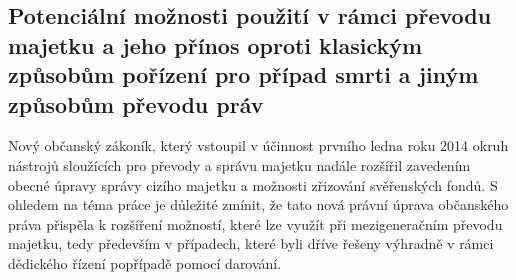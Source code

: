\documentclass{article}
\begin{document}

\newpage

\subsection{Potenciální možnosti použití v rámci převodu majetku a jeho přínos oproti klasickým způsobům pořízení pro případ smrti a jiným způsobům převodu práv}




Nový občanský zákoník, který vstoupil v účinnost prvního ledna roku 2014 okruh nástrojů sloužících pro převody a správu majetku nadále rozšířil zavedením obecné úpravy správy cizího majetku a možnosti zřizování svěřenských fondů. S ohledem na téma práce je důležité zmínit, že tato nová právní úprava občanského práva přispěla k rozšíření možností, které lze využít při mezigeneračním převodu majetku, tedy především v případech, které byli dříve řešeny výhradně v rámci dědického řízení popřípadě pomocí darování.\\
\end{document}
